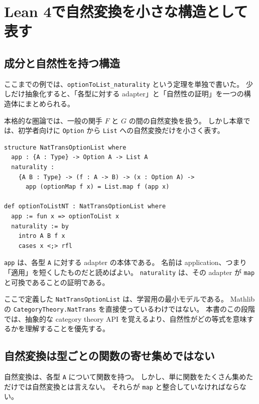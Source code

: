 \section{Lean 4で自然変換を小さな構造として表す}

\subsection{成分と自然性を持つ構造}

ここまでの例では、\texttt{optionToList\_naturality} という定理を単独で書いた。
少しだけ抽象化すると、「各型に対する adapter」と「自然性の証明」を一つの構造体にまとめられる。

本格的な圏論では、一般の関手 \(F\) と \(G\) の間の自然変換を扱う。
しかし本章では、初学者向けに \texttt{Option} から \texttt{List} への自然変換だけを小さく表す。

\begin{listing}[htbp]
\begin{verbatim}
structure NatTransOptionList where
  app : {A : Type} -> Option A -> List A
  naturality :
    {A B : Type} -> (f : A -> B) -> (x : Option A) ->
      app (optionMap f x) = List.map f (app x)

def optionToListNT : NatTransOptionList where
  app := fun x => optionToList x
  naturality := by
    intro A B f x
    cases x <;> rfl
\end{verbatim}
\caption{自然変換を成分と自然性のペアとして表す}
\label{lst:ch09_nattrans_structure}
\end{listing}

\texttt{app} は、各型 \texttt{A} に対する adapter の本体である。
名前は application、つまり「適用」を短くしたものだと読めばよい。
\texttt{naturality} は、その adapter が \texttt{map} と可換であることの証明である。

\begin{warningbox}
ここで定義した \texttt{NatTransOptionList} は、学習用の最小モデルである。
Mathlib の \texttt{CategoryTheory.NatTrans} を直接使っているわけではない。
本書のこの段階では、抽象的な category theory API を覚えるより、自然性がどの等式を意味するかを理解することを優先する。
\end{warningbox}

\subsection{自然変換は型ごとの関数の寄せ集めではない}

自然変換は、各型 \texttt{A} について関数を持つ。
しかし、単に関数をたくさん集めただけでは自然変換とは言えない。
それらが \texttt{map} と整合していなければならない。

